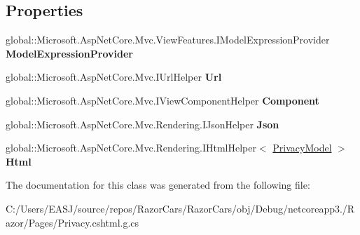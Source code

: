\subsection*{Properties}
\begin{DoxyCompactItemize}
\item 
\mbox{\label{class_razor_cars_1_1_pages_1_1_pages___privacy_a283a515239d62126eb62efa50c2d2f93}} 
global\+::\+Microsoft.\+Asp\+Net\+Core.\+Mvc.\+View\+Features.\+I\+Model\+Expression\+Provider {\bfseries Model\+Expression\+Provider}
\item 
\mbox{\label{class_razor_cars_1_1_pages_1_1_pages___privacy_a2888d719cb3afcbac3e2c31ec59a4a32}} 
global\+::\+Microsoft.\+Asp\+Net\+Core.\+Mvc.\+I\+Url\+Helper {\bfseries Url}
\item 
\mbox{\label{class_razor_cars_1_1_pages_1_1_pages___privacy_ab8fed5f6996364319f2088680aa72ee0}} 
global\+::\+Microsoft.\+Asp\+Net\+Core.\+Mvc.\+I\+View\+Component\+Helper {\bfseries Component}
\item 
\mbox{\label{class_razor_cars_1_1_pages_1_1_pages___privacy_a1afacd358c433941cd77f72a1df6383f}} 
global\+::\+Microsoft.\+Asp\+Net\+Core.\+Mvc.\+Rendering.\+I\+Json\+Helper {\bfseries Json}
\item 
\mbox{\label{class_razor_cars_1_1_pages_1_1_pages___privacy_ab32c40afbb7f6539cc4aea85f89782d8}} 
global\+::\+Microsoft.\+Asp\+Net\+Core.\+Mvc.\+Rendering.\+I\+Html\+Helper$<$ \mbox{\hyperlink{class_razor_cars_1_1_pages_1_1_privacy_model}{Privacy\+Model}} $>$ {\bfseries Html}
\end{DoxyCompactItemize}


The documentation for this class was generated from the following file\+:\begin{DoxyCompactItemize}
\item 
C\+:/\+Users/\+E\+A\+S\+J/source/repos/\+Razor\+Cars/\+Razor\+Cars/obj/\+Debug/netcoreapp3./\+Razor/\+Pages/Privacy.\+cshtml.\+g.\+cs\end{DoxyCompactItemize}
